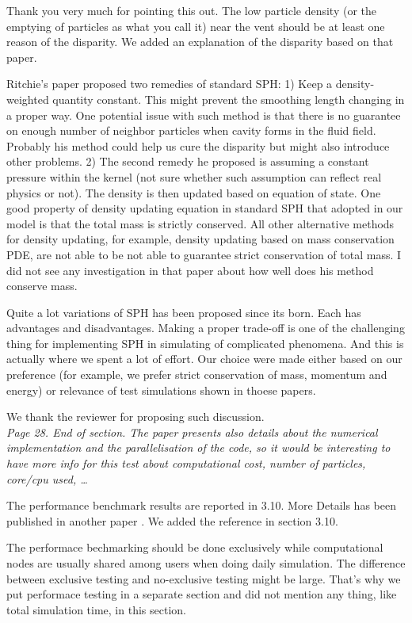 \documentclass[10pt,a4paper]{article}
\begin{document}
Thank you very much for pointing this out. The low particle density (or the emptying of particles as what you call it) near the vent should be at least one reason of the disparity. We added an explanation of the disparity based on that paper. 

Ritchie’s paper proposed two remedies of standard SPH: 1) Keep a density-weighted quantity constant. This might prevent the smoothing length changing in a proper way. One potential issue with such method is that there is no guarantee on enough number of neighbor particles when cavity forms in the fluid field. Probably his method could help us cure the disparity but might also introduce other problems. 2) The second remedy he proposed is assuming a constant pressure within the kernel (not sure whether such assumption can reflect real physics or not). The density is then updated based on equation of state. One good property of density updating equation in standard SPH that adopted in our model is that the total mass is strictly conserved. All other alternative methods for density updating, for example, density updating based on mass conservation PDE, are not able to be not able to guarantee strict conservation of total mass. I did not see any investigation in that paper about how well does his method conserve mass.

Quite a lot variations of SPH has been proposed since its born. Each has advantages and disadvantages. Making a proper trade-off is one of the challenging thing for implementing SPH in simulating of complicated phenomena. And this is actually where we spent a lot of effort. Our choice were made either based on our preference (for example, we prefer strict conservation of mass, momentum and energy) or relevance of test simulations shown in thoese papers. 

We thank the reviewer for proposing such discussion. \\[3pt]

\textit{Page 28. End of section. The paper presents also details about the numerical implementation and the parallelisation of the code, so it would be interesting to have more info for this test about computational cost, number of particles, core/cpu used, …}

The performance benchmark results are reported in 3.10. More Details has been published in another paper \citep{cao2017data}. We added the reference in section 3.10.

The performace bechmarking should be done exclusively while computational nodes are usually shared among users when doing daily simulation. The difference between exclusive testing and no-exclusive testing might be large. That's why we put performace testing in a separate section and did not mention any thing, like total simulation time, in this section.
\\[6pt] 
\end{document}
